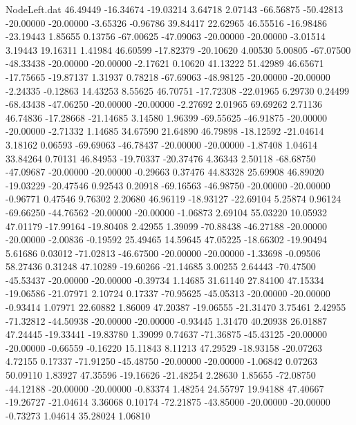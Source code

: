 \begin{filecontents}{NodeLeft.dat}
  46.49449  -16.34674  -19.03214     3.64718    2.07143  -66.56875  -50.42813  -20.00000  -20.00000   -3.65326   -0.96786   39.84417   22.62965
  46.55516  -16.98486  -23.19443     1.85655    0.13756  -67.00625  -47.09063  -20.00000  -20.00000   -3.01514    3.19443   19.16311    1.41984
  46.60599  -17.82379  -20.10620     4.00530    5.00805  -67.07500  -48.33438  -20.00000  -20.00000   -2.17621    0.10620   41.13222   51.42989
  46.65671  -17.75665  -19.87137     1.31937    0.78218  -67.69063  -48.98125  -20.00000  -20.00000   -2.24335   -0.12863   14.43253    8.55625
  46.70751  -17.72308  -22.01965     6.29730    0.24499  -68.43438  -47.06250  -20.00000  -20.00000   -2.27692    2.01965   69.69262    2.71136
  46.74836  -17.28668  -21.14685     3.14580    1.96399  -69.55625  -46.91875  -20.00000  -20.00000   -2.71332    1.14685   34.67590   21.64890
  46.79898  -18.12592  -21.04614     3.18162    0.06593  -69.69063  -46.78437  -20.00000  -20.00000   -1.87408    1.04614   33.84264    0.70131
  46.84953  -19.70337  -20.37476     4.36343    2.50118  -68.68750  -47.09687  -20.00000  -20.00000   -0.29663    0.37476   44.83328   25.69908
  46.89020  -19.03229  -20.47546     0.92543    0.20918  -69.16563  -46.98750  -20.00000  -20.00000   -0.96771    0.47546    9.76302    2.20680
  46.96119  -18.93127  -22.69104     5.25874    0.96124  -69.66250  -44.76562  -20.00000  -20.00000   -1.06873    2.69104   55.03220   10.05932
  47.01179  -17.99164  -19.80408     2.42955    1.39099  -70.88438  -46.27188  -20.00000  -20.00000   -2.00836   -0.19592   25.49465   14.59645
  47.05225  -18.66302  -19.90494     5.61686    0.03012  -71.02813  -46.67500  -20.00000  -20.00000   -1.33698   -0.09506   58.27436    0.31248
  47.10289  -19.60266  -21.14685     3.00255    2.64443  -70.47500  -45.53437  -20.00000  -20.00000   -0.39734    1.14685   31.61140   27.84100
  47.15334  -19.06586  -21.07971     2.10724    0.17337  -70.95625  -45.05313  -20.00000  -20.00000   -0.93414    1.07971   22.60882    1.86009
  47.20387  -19.06555  -21.31470     3.75461    2.42955  -71.32812  -44.50938  -20.00000  -20.00000   -0.93445    1.31470   40.20938   26.01887
  47.24445  -19.33441  -19.83780     1.39099    0.74637  -71.36875  -45.43125  -20.00000  -20.00000   -0.66559   -0.16220   15.11843    8.11213
  47.29529  -18.93158  -20.07263     4.72155    0.17337  -71.91250  -45.48750  -20.00000  -20.00000   -1.06842    0.07263   50.09110    1.83927
  47.35596  -19.16626  -21.48254     2.28630    1.85655  -72.08750  -44.12188  -20.00000  -20.00000   -0.83374    1.48254   24.55797   19.94188
  47.40667  -19.26727  -21.04614     3.36068    0.10174  -72.21875  -43.85000  -20.00000  -20.00000   -0.73273    1.04614   35.28024    1.06810

\end{filecontents}
